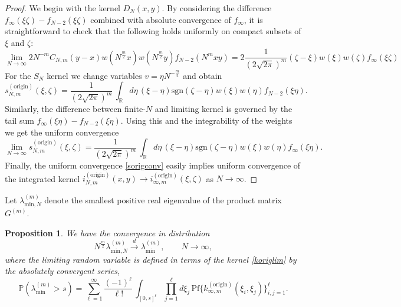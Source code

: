 \documentclass[11pt,reqno]{amsproc}
\newtheorem{proposition}[theorem]{Proposition}
\numberwithin{equation}{section}
\numberwithin{theorem}{section}
\begin{document}
\begin{proof}
We begin with the kernel $D_{N}(x,y)$. By considering the difference $f_{\infty}(\xi \zeta) - f_{N-2}(\xi \zeta)$ combined with absolute convergence of $f_{\infty}$, it is straightforward to check that the following holds uniformly on compact subsets of $\xi$ and $\zeta$:
\begin{equation}
\lim_{N \to \infty}2N^{-m}C_{N,m}(y-x)w(N^{\frac{m}{2}}x)w(N^{\frac{m}{2}}y)f_{N-2}(N^{m}xy) = 2\frac{1}{(2\sqrt{2\pi})^{m}}(\zeta-\xi)w(\xi)w(\zeta)f_{\infty}(\xi \zeta)
\end{equation}
For the $S_{N}$ kernel we change variables $v = \eta N^{-\frac{m}{2}}$ and obtain
\begin{equation}
s^{(\mathrm{origin})}_{N,m}(\xi,\zeta) = \frac{1}{(2\sqrt{2\pi})^{m}}\,\int_{\mathbb{R}}d\eta\,(\xi-\eta)\mathrm{sgn}(\zeta-\eta)w(\xi)w(\eta)f_{N-2}(\xi \eta).
\end{equation}
Similarly, the difference between finite-$N$ and limiting kernel is governed by the tail sum $f_{\infty}(\xi \eta) - f_{N-2}(\xi \eta)$. Using this and the integrability of the weights we get the uniform convergence
\begin{equation}
\lim_{N \to \infty}s^{(\mathrm{origin})}_{N,m}(\xi,\zeta) = \frac{1}{(2\sqrt{2\pi})^{m}}\,\int_{\mathbb{R}}d\eta\,(\xi-\eta)\mathrm{sgn}(\zeta-\eta)w(\xi)w(\eta)f_{\infty}(\xi \eta).\label{sorigconv}
\end{equation}
Finally, the uniform convergence \eqref{sorigconv} easily implies uniform convergence of the integrated kernel $i^{(\mathrm{origin})}_{N,m}(x,y) \to i^{(\mathrm{origin})}_{\infty,m}(\xi,\zeta)$ as $N \to \infty$.
\end{proof}

Let $\lambda^{(m)}_{\mathrm{min},N}$ denote the smallest positive real eigenvalue of the product matrix $G^{(m)}$. 
\begin{proposition}
We have the convergence in distribution
\begin{equation}
N^{\frac{m}{2}}\lambda^{(m)}_{\mathrm{min},N} \overset{d}{\longrightarrow} \lambda^{(m)}_{\mathrm{min}}, \qquad N \to \infty,
\end{equation}
where the limiting random variable is defined in terms of the kernel \eqref{koriglim} by the absolutely convergent series,
\begin{equation}
\mathbb{P}(\lambda^{(m)}_{\mathrm{min}} > s) = \sum_{\ell=1}^{\infty}\frac{(-1)^{\ell}}{\ell!}\,\int_{[0,s]^{\ell}}\prod_{j=1}^{\ell}d\xi_{j}\,\mathrm{Pf}\bigg\{k^{(\mathrm{origin})}_{\infty,m}(\xi_{i},\xi_{j})\bigg\}_{i,j=1}^{\ell}.
\end{equation}
\end{proposition}
\end{document}
